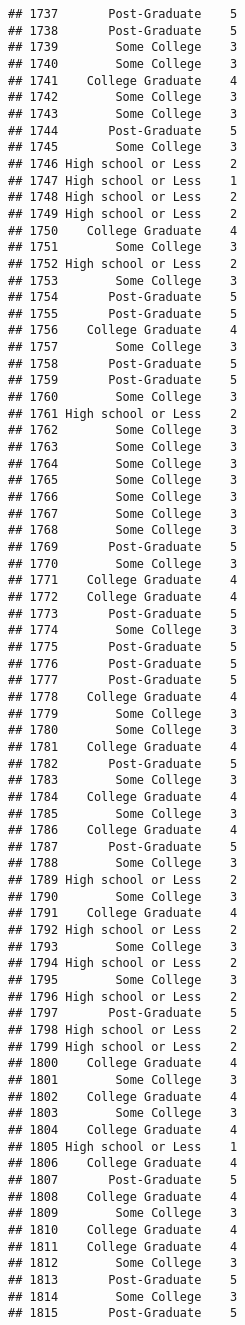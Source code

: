 \documentclass[
]{article}
\begin{document}
\begin{verbatim}
## 1737       Post-Graduate    5
## 1738       Post-Graduate    5
## 1739        Some College    3
## 1740        Some College    3
## 1741    College Graduate    4
## 1742        Some College    3
## 1743        Some College    3
## 1744       Post-Graduate    5
## 1745        Some College    3
## 1746 High school or Less    2
## 1747 High school or Less    1
## 1748 High school or Less    2
## 1749 High school or Less    2
## 1750    College Graduate    4
## 1751        Some College    3
## 1752 High school or Less    2
## 1753        Some College    3
## 1754       Post-Graduate    5
## 1755       Post-Graduate    5
## 1756    College Graduate    4
## 1757        Some College    3
## 1758       Post-Graduate    5
## 1759       Post-Graduate    5
## 1760        Some College    3
## 1761 High school or Less    2
## 1762        Some College    3
## 1763        Some College    3
## 1764        Some College    3
## 1765        Some College    3
## 1766        Some College    3
## 1767        Some College    3
## 1768        Some College    3
## 1769       Post-Graduate    5
## 1770        Some College    3
## 1771    College Graduate    4
## 1772    College Graduate    4
## 1773       Post-Graduate    5
## 1774        Some College    3
## 1775       Post-Graduate    5
## 1776       Post-Graduate    5
## 1777       Post-Graduate    5
## 1778    College Graduate    4
## 1779        Some College    3
## 1780        Some College    3
## 1781    College Graduate    4
## 1782       Post-Graduate    5
## 1783        Some College    3
## 1784    College Graduate    4
## 1785        Some College    3
## 1786    College Graduate    4
## 1787       Post-Graduate    5
## 1788        Some College    3
## 1789 High school or Less    2
## 1790        Some College    3
## 1791    College Graduate    4
## 1792 High school or Less    2
## 1793        Some College    3
## 1794 High school or Less    2
## 1795        Some College    3
## 1796 High school or Less    2
## 1797       Post-Graduate    5
## 1798 High school or Less    2
## 1799 High school or Less    2
## 1800    College Graduate    4
## 1801        Some College    3
## 1802    College Graduate    4
## 1803        Some College    3
## 1804    College Graduate    4
## 1805 High school or Less    1
## 1806    College Graduate    4
## 1807       Post-Graduate    5
## 1808    College Graduate    4
## 1809        Some College    3
## 1810    College Graduate    4
## 1811    College Graduate    4
## 1812        Some College    3
## 1813       Post-Graduate    5
## 1814        Some College    3
## 1815       Post-Graduate    5

\end{verbatim}
\end{document}
